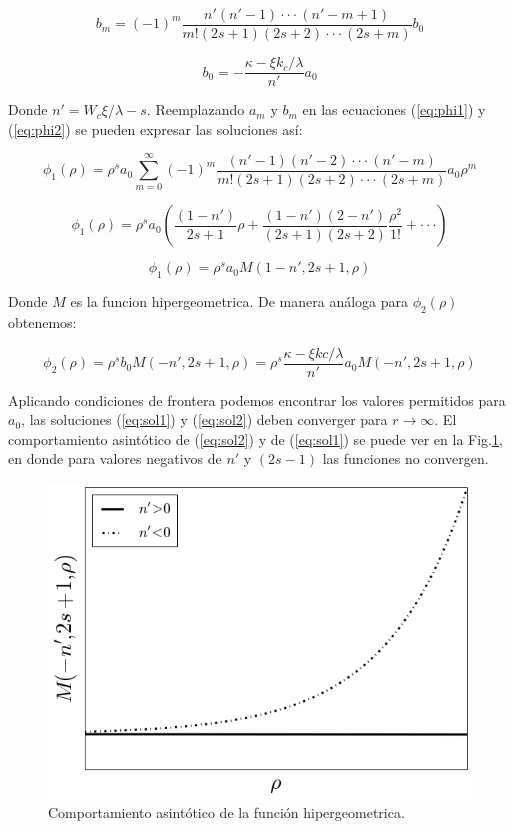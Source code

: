 \documentclass[a4paper, 12pt]{article} %
\begin{document}
\begin{equation}
b_m = (-1)^m \dfrac{n'(n'-1)\cdot\cdot\cdot(n'-m+1)}{m!(2s+1)(2s+2)\cdot\cdot\cdot(2s+m)}b_0
\end{equation}

\begin{equation}
b_0 = -\dfrac{\kappa - \xi k_c /\lambda}{n'}a_0
\end{equation}

Donde $n' = W_c\xi/\lambda - s$. Reemplazando $a_m$ y $b_m$ en las ecuaciones (\ref{eq:phi1}) y (\ref{eq:phi2})
se pueden expresar las soluciones as\'i:

\[
\phi_1(\rho) = \rho^s a_0 \sum  \limits_{m=0}^{\infty} (-1)^m \dfrac{(n'-1)(n'-2)\cdot\cdot\cdot(n'-m)}{m!(2s+1)(2s+2)\cdot\cdot\cdot(2s+m)}a_0 \rho^m 
\]

\[
\phi_1(\rho) = \rho^s a_0 \left( \dfrac{(1-n')}{2s+1} \rho + \dfrac{(1-n')(2-n')}{(2s+1)(2s+2)}\dfrac{\rho^2}{1!} + \cdot\cdot\cdot  \right)
\]

\begin{equation}\label{eq:sol1}
\phi_1(\rho) = 	\rho^s a_0 M(1-n',2s+1,\rho)
\end{equation}

Donde $M$ es la funcion hipergeometrica. De manera an\'aloga para $\phi_2(\rho)$ obtenemos:

\begin{equation}\label{eq:sol2}
\phi_2(\rho) = \rho^s b_0 M(-n',2s+1,\rho) = \rho^s \dfrac{\kappa - \xi kc / \lambda}{n'} a_0 M(-n',2s+1,\rho)
\end{equation}

Aplicando condiciones de frontera podemos encontrar los valores permitidos para $a_0$, las soluciones
(\ref{eq:sol1}) y (\ref{eq:sol2}) deben converger para $r \rightarrow \infty$. El comportamiento 
asint\'otico de (\ref{eq:sol2}) y de (\ref{eq:sol1}) se puede ver en la Fig.\ref{fig:hypgeo}, 
en donde para valores negativos de $n'$ y $(2s-1)$ las funciones no convergen.

\begin{figure}[H]
\centering
\includegraphics[scale=0.4]{hypgeo.png}
\caption*{Comportamiento asint\'otico de la funci\'on hipergeometrica.}
\label{fig:hypgeo}
\end{figure}  
\end{document}
